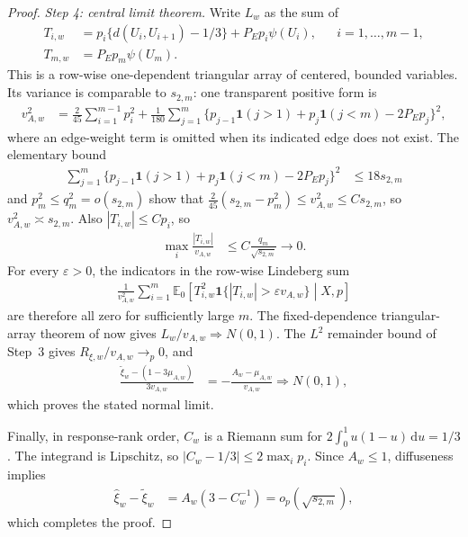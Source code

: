 \begin{proof}
\medskip\noindent
\emph{Step 4: central limit theorem.}
Write $L_w$ as the sum of
\begin{align*}
  T_{i,w}
  &=p_i\{d(U_i,U_{i+1})-1/3\}+P_Ep_i\psi(U_i),
  &&i=1,\ldots,m-1,\\
  T_{m,w}
  &=P_Ep_m\psi(U_m).
\end{align*}
This is a row-wise one-dependent triangular array of centered, bounded
variables. Its variance is comparable to $s_{2,m}$: one transparent positive
form is
\begin{align*}
  v_{A,w}^2
  &=\frac{2}{45}\sum_{i=1}^{m-1}p_i^2
    +\frac1{180}\sum_{j=1}^m
      \{p_{j-1}\mathbf{1}(j>1)
        +p_j\mathbf{1}(j<m)-2P_Ep_j\}^2,
\end{align*}
where an edge-weight term is omitted when its indicated edge does not exist.
The elementary bound
\begin{align*}
  \sum_{j=1}^m
    \{p_{j-1}\mathbf 1(j>1)+p_j\mathbf 1(j<m)-2P_Ep_j\}^2
  &\leq18s_{2,m}
\end{align*}
and $p_m^2\leq q_m^2=o(s_{2,m})$ show that
$\frac{2}{45}(s_{2,m}-p_m^2)\leq v_{A,w}^2\leq C s_{2,m}$, so
$v_{A,w}^2\asymp s_{2,m}$. Also $|T_{i,w}|\leq Cp_i$, so
\begin{align*}
  \max_i\frac{|T_{i,w}|}{v_{A,w}}
  &\leq C\frac{q_m}{\sqrt{s_{2,m}}}
  \longrightarrow0.
\end{align*}
For every $\varepsilon>0$, the indicators in the row-wise Lindeberg sum
\begin{align*}
  \frac1{v_{A,w}^2}\sum_{i=1}^m
  \mathbb E_0\left[
    T_{i,w}^2\mathbf 1\{|T_{i,w}|>\varepsilon v_{A,w}\}
    \middle|X,p
  \right]
\end{align*}
are therefore all zero for sufficiently large $m$. The fixed-dependence
triangular-array theorem of \citet[Theorem~1.1]{janson2021} now gives
$L_w/v_{A,w}\Longrightarrow N(0,1)$. The $L^2$ remainder bound of Step~3
gives $R_{\xi,w}/v_{A,w}\to_p0$, and
\begin{align*}
  \frac{\widetilde\xi_w-(1-3\mu_{A,w})}{3v_{A,w}}
  &=-\frac{A_w-\mu_{A,w}}{v_{A,w}}
  \mathrel{\Longrightarrow}N(0,1),
\end{align*}
which proves the stated normal limit.

Finally, in response-rank order, $C_w$ is a Riemann sum for
$2\int_0^1u(1-u)\,\mathrm{d}u=1/3$. The integrand is Lipschitz, so
$|C_w-1/3|\leq2\max_i p_i$. Since $A_w\leq1$, diffuseness implies
\begin{align*}
  \widehat\xi_w-\widetilde\xi_w
  &=A_w\left(3-C_w^{-1}\right)
  =o_p(\sqrt{s_{2,m}}),
\end{align*}
which completes the proof.
\end{proof}

